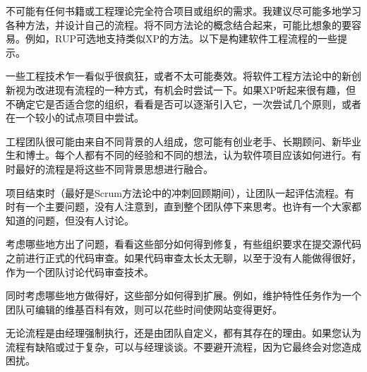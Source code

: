 
不可能有任何书籍或工程理论完全符合项目或组织的需求。我建议尽可能多地学习各种方法，并设计自己的流程。将不同方法论的概念结合起来，可能比想象的要容易。例如，RUP可选地支持类似XP的方法。以下是构建软件工程流程的一些提示。


一些工程技术乍一看似乎很疯狂，或者不太可能奏效。将软件工程方法论中的新创新视为改进现有流程的一种方式，有机会时尝试一下。如果XP听起来很有趣，但不确定它是否适合您的组织，看看是否可以逐渐引入它，一次尝试几个原则，或者在一个较小的试点项目中尝试。


工程团队很可能由来自不同背景的人组成，您可能有创业老手、长期顾问、新毕业生和博士。每个人都有不同的经验和不同的想法，认为软件项目应该如何进行。有时最好的流程是将这些不同背景思想进行融合。


项目结束时（最好是Scrum方法论中的冲刺回顾期间），让团队一起评估流程。有时有一个主要问题，没有人注意到，直到整个团队停下来思考。也许有一个大家都知道的问题，但没有人讨论。

考虑哪些地方出了问题，看看这些部分如何得到修复，有些组织要求在提交源代码之前进行正式的代码审查。如果代码审查太长太无聊，以至于没有人能做得很好，作为一个团队讨论代码审查技术。

同时考虑哪些地方做得好，这些部分如何得到扩展。例如，维护特性任务作为一个团队可编辑的维基百科有效，则可以花些时间使网站变得更好。


无论流程是由经理强制执行，还是由团队自定义，都有其存在的理由。如果您认为流程有缺陷或过于复杂，可以与经理谈谈。不要避开流程，因为它最终会对您造成困扰。


